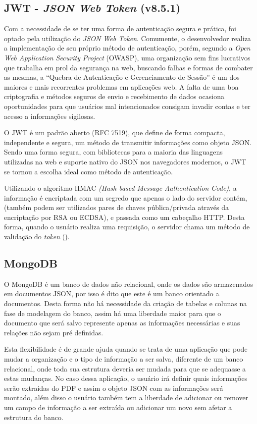 \subsection{JWT - \textit{JSON Web Token} (v8.5.1) }

Com a necessidade de se ter uma forma de autenticação segura e prática, foi optado pela utilização do \textit{JSON Web Token}. Comumente, o desenvolvedor realiza a implementação de seu próprio método de autenticação, porém, segundo a \textit{Open Web Application Security Project} (OWASP), uma organização sem fins lucrativos que trabalha em prol da segurança na web, buscando falhas e formas de combater as mesmas, a “Quebra de Autenticação e Gerenciamento de Sessão” é um dos maiores e mais recorrentes problemas em aplicações web. A falta de uma boa criptografia e métodos seguros de envio e recebimento de dados ocasiona oportunidades para que usuários mal intencionados consigam invadir contas e ter acesso a informações sigilosas.

O JWT é um padrão aberto (RFC 7519), que define de forma compacta, independente e segura, um método de transmitir informações como objeto JSON. Sendo uma forma segura, com bibliotecas para a maioria das linguagens utilizadas na web e suporte nativo do JSON nos navegadores modernos,  o JWT se tornou a escolha ideal como método de autenticação. 

Utilizando o algoritmo HMAC \textit{(Hash based Message Authentication Code)}, a informação é encriptada com um segredo que apenas o lado do servidor contém, (também podem ser utilizados pares de chaves pública/privada através da encriptação por RSA ou ECDSA), e passada como um cabeçalho HTTP. Desta forma, quando o usuário realiza uma requisição, o servidor chama um método de validação do \textit{token} (\cite{jwt}).

\subsection{MongoDB}

O MongoDB é um banco de dados não relacional, onde os dados são armazenados em documentos JSON, por isso é dito que este é um banco orientado a documentos. Desta forma não há necessidade da criação de tabelas e colunas na fase de modelagem do banco, assim há uma liberdade maior para que o documento que será salvo represente apenas as informações necessárias e suas relações não sejam pré definidas.

Esta flexibilidade é de grande ajuda quando se trata de uma aplicação que pode mudar a organização e o tipo de informação a ser salva, diferente de um banco relacional, onde toda sua estrutura deveria ser mudada para que se adequasse a estas mudanças. No caso dessa aplicação, o usuário irá definir quais informações serão extraídas do PDF e assim o objeto JSON com as informações será montado, além disso o usuário também tem a liberdade de adicionar ou remover um campo de informação a ser extraída ou adicionar um novo sem afetar a estrutura do banco.

